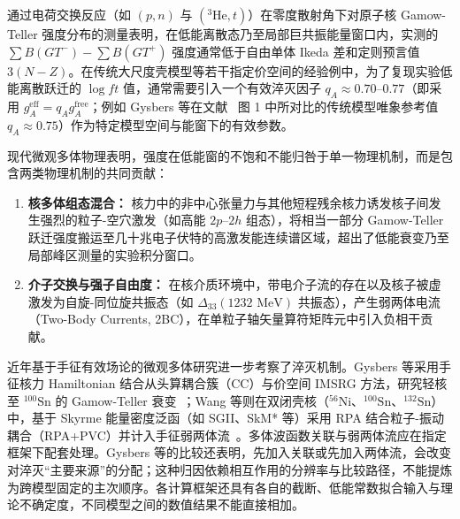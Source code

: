 通过电荷交换反应（如 $(p, n)$ 与 $(^3\mathrm{He}, t)$）在零度散射角下对原子核 Gamow-Teller 强度分布的测量表明，在低能离散态乃至局部巨共振能量窗口内，实测的 $\sum B(GT^-) - \sum B(GT^+)$ 强度通常低于自由单体 Ikeda 差和定则预言值 $3(N-Z)$。在传统大尺度壳模型等若干指定价空间的经验例中，为了复现实验低能离散跃迁的 $\log ft$ 值，通常需要引入一个有效淬灭因子 $q_A \approx 0.70\text{--}0.77$（即采用 $g_A^{\mathrm{eff}} = q_A g_A^{\mathrm{free}}$；例如 Gysbers 等在文献~\cite{gysbers-2019-ab-initio-beta-decay-quenching} 图 1 中所对比的传统模型唯象参考值 $q_A \approx 0.75$）作为特定模型空间与能窗下的有效参数。

现代微观多体物理表明，强度在低能窗的不饱和不能归咎于单一物理机制，而是包含两类物理机制的共同贡献：
\begin{enumerate}
\item \textbf{核多体组态混合：} 核力中的非中心张量力与其他短程残余核力诱发核子间发生强烈的粒子-空穴激发（如高能 $2p\text{--}2h$ 组态），将相当一部分 Gamow-Teller 跃迁强度搬运至几十兆电子伏特的高激发能连续谱区域，超出了低能衰变乃至局部峰区测量的实验积分窗口。
\item \textbf{介子交换与强子自由度：} 在核介质环境中，带电介子流的存在以及核子被虚激发为自旋-同位旋共振态（如 $\Delta_{33}(1232\text{ MeV})$ 共振态），产生弱两体电流（Two-Body Currents, 2BC），在单粒子轴矢量算符矩阵元中引入负相干贡献。
\end{enumerate}

近年基于手征有效场论的微观多体研究进一步考察了淬灭机制。Gysbers 等采用手征核力 Hamiltonian 结合从头算耦合簇（CC）与价空间 IMSRG 方法，研究轻核至 $^{100}\mathrm{Sn}$ 的 Gamow-Teller 衰变~\cite{gysbers-2019-ab-initio-beta-decay-quenching}；Wang 等则在双闭壳核（$^{56}\mathrm{Ni}$、$^{100}\mathrm{Sn}$、$^{132}\mathrm{Sn}$）中，基于 Skyrme 能量密度泛函（如 SGII、SkM* 等）采用 RPA 结合粒子-振动耦合（RPA+PVC）并计入手征弱两体流~\cite{wang-2026-axial-coupling-quenching-joint-effects}。多体波函数关联与弱两体流应在指定框架下配套处理。Gysbers 等的比较还表明，先加入关联或先加入两体流，会改变对淬灭“主要来源”的分配；这种归因依赖相互作用的分辨率与比较路径，不能提炼为跨模型固定的主次顺序。各计算框架还具有各自的截断、低能常数拟合输入与理论不确定度，不同模型之间的数值结果不能直接相加。

